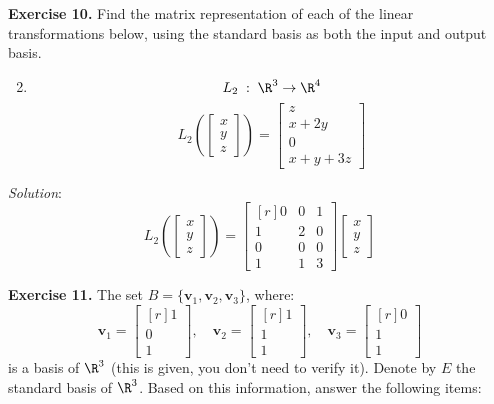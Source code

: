 \documentclass[12pt]{article}
\begin{document}
\textbf{Exercise 10.} Find the matrix representation of each of the linear transformations below, using the standard basis as both the input and output basis.

\begin{enumerate}

\setcounter{enumi}{1}

\item 
\[
L_2\;:\;\R^3\to\R^4
\]
\[
L_2\left(\begin{bmatrix} x\\y\\z\end{bmatrix}\right) = \begin{bmatrix} z\\x+2y\\0\\x+y+3z\end{bmatrix}
\]
\end{enumerate}

\emph{Solution}:
\[
L_2\left(\begin{bmatrix} x\\y\\z\end{bmatrix}\right)=
\begin{bmatrix*}[r]
0 & 0 & 1\\
1 & 2 & 0\\
0 & 0 & 0\\
1 & 1 & 3
\end{bmatrix*}
\begin{bmatrix}x\\y\\z\end{bmatrix}
\]
\proofend

\textbf{Exercise 11.} The set  $B=\{\mathbf{v}_1,\mathbf{v}_2,\mathbf{v}_3\}$, where:
\[
\mathbf{v}_1=\begin{bmatrix*}[r] 1\\ 0\\ 1\end{bmatrix*},\quad
\mathbf{v}_2=\begin{bmatrix*}[r] 1\\ 1\\ 1\end{bmatrix*},\quad
\mathbf{v}_3=\begin{bmatrix*}[r] 0\\ 1\\ 1\end{bmatrix*}
\]
is a basis of $\R^3$ (this is given, you don't need to verify it). Denote by $E$ the standard basis of $\R^3$. Based on this information, answer the following items:
\end{document}

